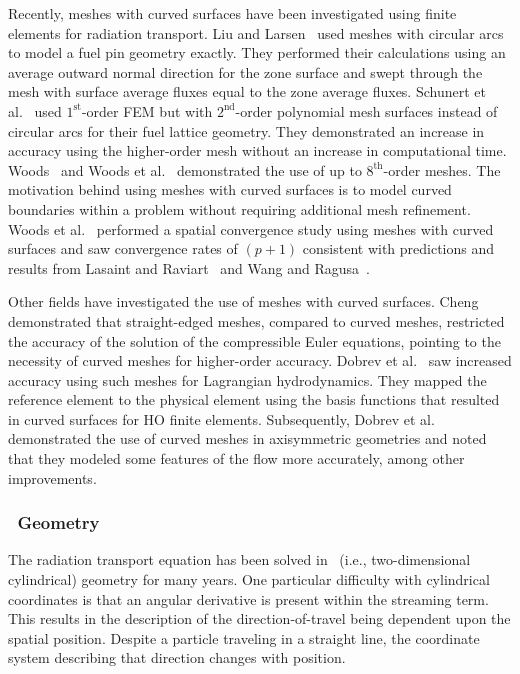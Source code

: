 \documentclass[12pt,letterpaper]{article}
\begin{document}
Recently, meshes with curved surfaces have been investigated using finite elements for radiation transport. Liu and Larsen~\cite{Liu2015SNCurvedMesh} used meshes with circular arcs to model a fuel pin geometry exactly. They performed their calculations using an average outward normal direction for the zone surface and swept through the mesh with surface average fluxes equal to the zone average fluxes. Schunert et al.~\cite{Schunert2017HOMeshes} used $1^\text{st}$-order FEM but with $2^\text{nd}$-order polynomial mesh surfaces instead of circular arcs for their fuel lattice geometry. They demonstrated an increase in accuracy using the higher-order mesh without an increase in computational time. Woods~\cite{WoodsThesis} and Woods et al.~\cite{WoodsHoDgfemXyCurved} demonstrated the use of up to $8^\text{th}$-order meshes. The motivation behind using meshes with curved surfaces is to model curved boundaries within a problem without requiring additional mesh refinement. Woods et al.~\cite{WoodsHoDgfemXyCurved} performed a spatial convergence study using meshes with curved surfaces and saw convergence rates of $(p+1)$ consistent with predictions and results from Lasaint and Raviart~\cite{LasaintFEM} and Wang and Ragusa~\cite{WangHODGTransport}.


Other fields have investigated the use of meshes with curved surfaces. Cheng~\cite{ChengCurvMeshEulerEqs} demonstrated that straight-edged meshes, compared to curved meshes, restricted the accuracy of the solution of the compressible Euler equations, pointing to the necessity of curved meshes for higher-order accuracy. Dobrev et al.~\cite{DobrevHOFEMHydro} saw increased accuracy using such meshes for Lagrangian hydrodynamics. They mapped the reference element to the physical element using the basis functions that resulted in curved surfaces for HO finite elements. Subsequently, Dobrev et al.~\cite{DobrevHOAxisymmetric} demonstrated the use of curved meshes in axisymmetric geometries and noted that they modeled some features of the flow more accurately, among other improvements.

\subsubsection{\RZ\ Geometry}
\label{sec:RZGeometryIntro}
The radiation transport equation has been solved in \RZ\ (i.e., two-dimensional cylindrical) geometry for many years. One particular difficulty with cylindrical coordinates is that an angular derivative is present within the streaming term. This results in the description of the direction-of-travel being dependent upon the spatial position. Despite a particle traveling in a straight line, the coordinate system describing that direction changes with position. 
\end{document}
